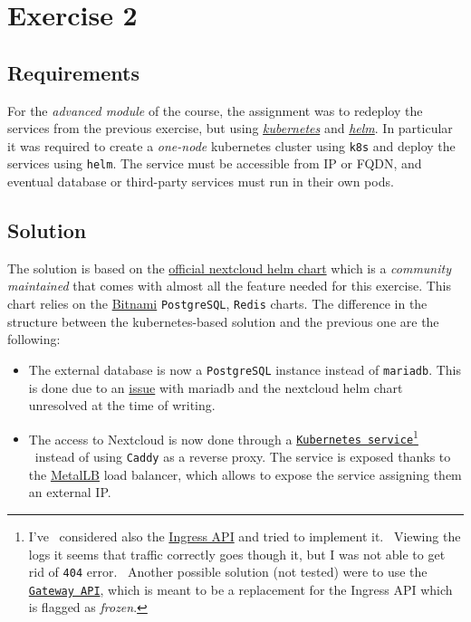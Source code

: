 \section{Exercise 2}

\subsection{Requirements}
\label{subsec:requirements}

For the \textit{advanced module} of the course, the assignment was to redeploy the services from the previous exercise, but using \href{https://kubernetes.io/}{\textit{kubernetes}} and \href{https://helm.sh/}{\textit{helm}}.
In particular it was required to create a \textit{one-node} kubernetes cluster using \texttt{k8s} and deploy the services using \texttt{helm}. 
The service must be accessible from IP or FQDN, and eventual database or third-party services must run in their own pods.

\subsection{Solution}

The solution is based on the \href{https://github.com/nextcloud/helm/tree/main/charts/nextcloud}{official nextcloud helm chart} which is a \textit{community maintained} that comes with almost all the feature needed for this exercise. 
This chart relies on the \href{https://bitnami.com/}{Bitnami} \texttt{PostgreSQL}, \texttt{Redis} charts.
The difference in the structure between the kubernetes-based solution and the previous one are the following: 

\begin{itemize}
    \itemsep0em
    \item The external database is now a \texttt{PostgreSQL} instance instead of \texttt{mariadb}. This is done due to an \href{https://github.com/nextcloud/helm/issues/506}{issue} with mariadb and the nextcloud helm chart unresolved at the time of writing.
    \item The access to Nextcloud is now done through a \href{https://kubernetes.io/docs/tutorials/kubernetes-basics/expose/expose-intro/}{\texttt{Kubernetes service}}\footnote{I've \
        considered also the \href{https://kubernetes.io/docs/concepts/services-networking/ingress/}{Ingress API} and tried to implement it. \
        Viewing the logs it seems that traffic correctly goes though it, but I was not able to get rid of \texttt{404} error. \
        Another possible solution (not tested) were to use the \href{https://kubernetes.io/docs/concepts/services-networking/gateway/}{\texttt{Gateway API}}, which is meant to be a replacement for the Ingress API which is flagged as \textit{frozen}.} \ 
        instead of using \texttt{Caddy} as a reverse proxy. The service is exposed thanks to the \href{https://metallb.org/}{MetalLB} load balancer, which allows to expose the service assigning them an external IP.
\end{itemize}

